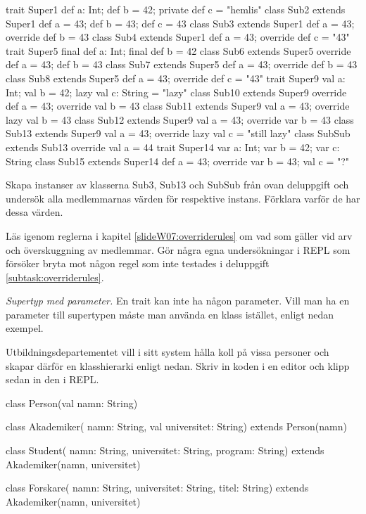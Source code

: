 \begin{REPL}
trait Super1 { def a: Int; def b = 42; private def c = "hemlis" }
class Sub2 extends Super1 { def a = 43; def b = 43; def c = 43 }   
class Sub3 extends Super1 { def a = 43; override def b = 43 }   
class Sub4 extends Super1 { def a = 43; override def c = "43" } 
trait Super5 { final def a: Int; final def b = 42 }
class Sub6 extends Super5 { override def a = 43; def b = 43 }   
class Sub7 extends Super5 { def a = 43; override def b = 43 }   
class Sub8 extends Super5 { def a = 43; override def c = "43" }   
trait Super9 { val a: Int; val b = 42; lazy val c: String = "lazy" }
class Sub10 extends Super9 { override def a = 43; override val b = 43 }   
class Sub11 extends Super9 { val a = 43; override lazy val b = 43 }   
class Sub12 extends Super9 { val a = 43; override var b = 43 }
class Sub13 extends Super9 { val a = 43; override lazy val c = "still lazy" } 
class SubSub extends Sub13 { override val a = 44}  
trait Super14 { var a: Int; var b = 42; var c: String }
class Sub15 extends Super14 { def a = 43; override var b = 43; val c = "?" } 
\end{REPL}

\Subtask Skapa instanser av klasserna Sub3, Sub13 och SubSub från ovan deluppgift och undersök alla medlemmarnas värden för respektive instans. Förklara varför de har dessa värden.

\Subtask Läs igenom reglerna i kapitel  \ref{slideW07:overriderules} om vad som gäller vid arv och överskuggning av medlemmar. Gör några egna undersökningar i REPL som försöker bryta mot någon regel som inte testades i deluppgift \ref{subtask:overriderules}.

\Task \emph{Supertyp med parameter.} En trait kan inte ha någon parameter. Vill man ha en parameter till supertypen måste man använda en klass istället, enligt nedan exempel. 

Utbildningsdepartementet vill i sitt system hålla koll på vissa personer och skapar därför en klasshierarki enligt nedan. Skriv in koden i en editor och klipp sedan in den i REPL.
\begin{Code}
class Person(val namn: String)

class Akademiker(
  namn: String,   
  val universitet: String) extends Person(namn)

class Student(
  namn: String, 
  universitet: String,
  program: String) extends Akademiker(namn, universitet)

class Forskare(
  namn: String, 
  universitet: String, 
  titel: String) extends Akademiker(namn, universitet)
\end{Code} 


